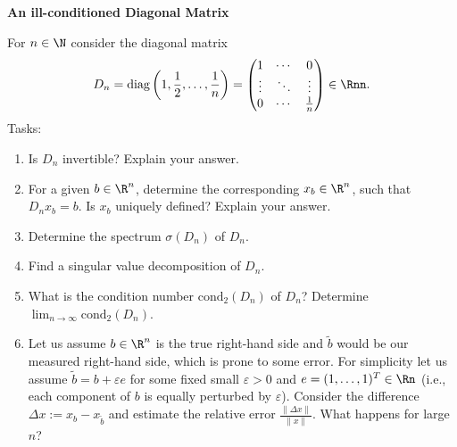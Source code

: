 \textbf{\normalsize An ill-conditioned Diagonal Matrix}

For $n \in \N$ consider the diagonal matrix
$$D_n = \text{diag}\left(1,\frac{1}{2},\ldots, \frac{1}{n}\right) = \begin{pmatrix}
1 & \cdots & 0\\
\vdots & \ddots & \vdots\\
0 & \cdots &  \frac{1}{n}
\end{pmatrix} \in \Rnn.$$
Tasks:
\begin{enumerate}
	\item Is $D_n$ invertible? Explain your answer.
	\item For a given $b \in \R^n$, determine the corresponding $x_b \in \R^n$, such that $D_nx_b = b$. Is $x_b$ uniquely defined? Explain your answer.
	\item Determine the spectrum $\sigma(D_n)$ of $D_n$.
	\item Find a singular value decomposition of $D_n$.
	\item What is the condition number $\text{cond}_2(D_n)$ of $D_n$?	Determine $\lim_{n\to \infty}\text{cond}_2(D_n)$. 
	\item Let us assume $b \in \R^n$ is the true right-hand side and $\tilde{b}$ would be our measured right-hand side, which is prone to some error. For simplicity let us assume $\tilde{b} = b + \varepsilon e$ for some fixed small $\varepsilon > 0$ and $e=(1,\ldots,1)^T \in \Rn$ (i.e., each component of $b$ is equally perturbed by $\varepsilon$). Consider the difference $\Delta x := x_b - x_{\tilde{b}}$ and estimate the relative error $\frac{\|\Delta x\|}{\|x\|}$. What happens for large $n$?
\end{enumerate}